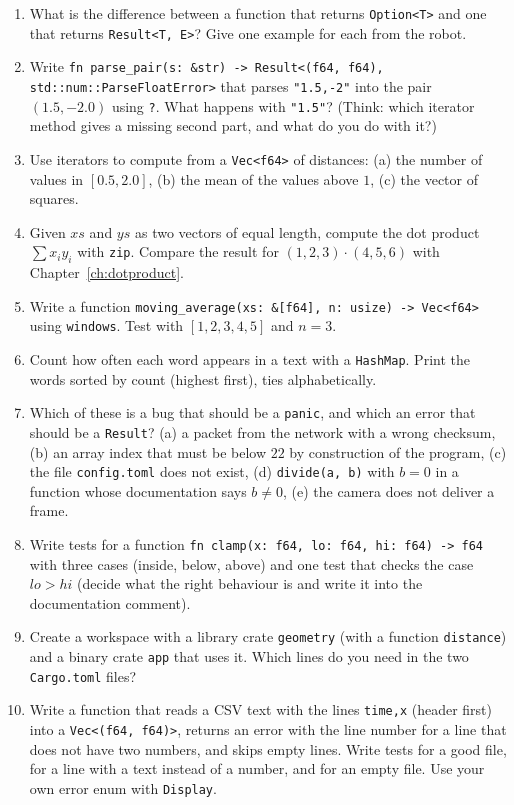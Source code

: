 \begin{enumerate}[label=\textbf{\thechapter.\arabic*}]
  \item What is the difference between a function that returns \verb!Option<T>! and one that returns \verb!Result<T, E>!? Give one example for each from the robot.
  \item Write \verb!fn parse_pair(s: &str) -> Result<(f64, f64), std::num::ParseFloatError>! that parses \verb!"1.5,-2"! into the pair $(1.5,-2.0)$ using \verb!?!. What happens with \verb!"1.5"!? (Think: which iterator method gives a missing second part, and what do you do with it?)
  \item Use iterators to compute from a \verb!Vec<f64>! of distances: (a) the number of values in $[0.5,2.0]$, (b) the mean of the values above $1$, (c) the vector of squares.
  \item Given $xs$ and $ys$ as two vectors of equal length, compute the dot product $\sum x_iy_i$ with \verb!zip!. Compare the result for $(1,2,3)\cdot(4,5,6)$ with Chapter~\ref{ch:dotproduct}.
  \item Write a function \verb!moving_average(xs: &[f64], n: usize) -> Vec<f64>! using \verb!windows!. Test with $[1,2,3,4,5]$ and $n=3$.
  \item Count how often each word appears in a text with a \verb!HashMap!. Print the words sorted by count (highest first), ties alphabetically.
  \item Which of these is a bug that should be a \verb!panic!, and which an error that should be a \verb!Result!? (a) a packet from the network with a wrong checksum, (b) an array index that must be below $22$ by construction of the program, (c) the file \verb!config.toml! does not exist, (d) \verb!divide(a, b)! with $b=0$ in a function whose documentation says $b\neq0$, (e) the camera does not deliver a frame.
  \item Write tests for a function \verb!fn clamp(x: f64, lo: f64, hi: f64) -> f64! with three cases (inside, below, above) and one test that checks the case $lo>hi$ (decide what the right behaviour is and write it into the documentation comment).
  \item Create a workspace with a library crate \verb!geometry! (with a function \verb!distance!) and a binary crate \verb!app! that uses it. Which lines do you need in the two \verb!Cargo.toml! files?
  \item[\textbf{\thechapter.10}$\star$] Write a function that reads a CSV text with the lines \verb!time,x! (header first) into a \verb!Vec<(f64, f64)>!, returns an error with the line number for a line that does not have two numbers, and skips empty lines. Write tests for a good file, for a line with a text instead of a number, and for an empty file. Use your own error enum with \verb!Display!.
\end{enumerate}
